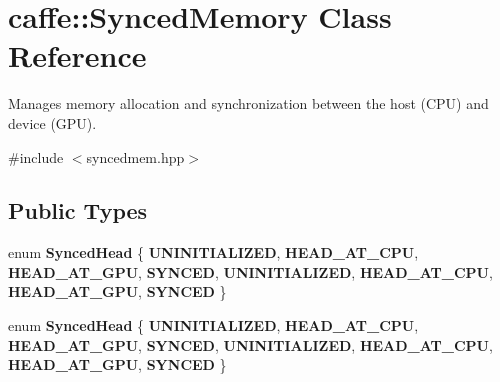 \hypertarget{classcaffe_1_1_synced_memory}{}\section{caffe\+:\+:Synced\+Memory Class Reference}
\label{classcaffe_1_1_synced_memory}


Manages memory allocation and synchronization between the host (C\+PU) and device (G\+PU).  




{\ttfamily \#include $<$syncedmem.\+hpp$>$}

\subsection*{Public Types}
\begin{DoxyCompactItemize}
\item 
\mbox{\label{classcaffe_1_1_synced_memory_aa9d505f04322f6e521a57b8fc51dfba1}} 
enum {\bfseries Synced\+Head} \{ \newline
{\bfseries U\+N\+I\+N\+I\+T\+I\+A\+L\+I\+Z\+ED}, 
{\bfseries H\+E\+A\+D\+\_\+\+A\+T\+\_\+\+C\+PU}, 
{\bfseries H\+E\+A\+D\+\_\+\+A\+T\+\_\+\+G\+PU}, 
{\bfseries S\+Y\+N\+C\+ED}, 
\newline
{\bfseries U\+N\+I\+N\+I\+T\+I\+A\+L\+I\+Z\+ED}, 
{\bfseries H\+E\+A\+D\+\_\+\+A\+T\+\_\+\+C\+PU}, 
{\bfseries H\+E\+A\+D\+\_\+\+A\+T\+\_\+\+G\+PU}, 
{\bfseries S\+Y\+N\+C\+ED}
 \}
\item 
\mbox{\label{classcaffe_1_1_synced_memory_aa9d505f04322f6e521a57b8fc51dfba1}} 
enum {\bfseries Synced\+Head} \{ \newline
{\bfseries U\+N\+I\+N\+I\+T\+I\+A\+L\+I\+Z\+ED}, 
{\bfseries H\+E\+A\+D\+\_\+\+A\+T\+\_\+\+C\+PU}, 
{\bfseries H\+E\+A\+D\+\_\+\+A\+T\+\_\+\+G\+PU}, 
{\bfseries S\+Y\+N\+C\+ED}, 
\newline
{\bfseries U\+N\+I\+N\+I\+T\+I\+A\+L\+I\+Z\+ED}, 
{\bfseries H\+E\+A\+D\+\_\+\+A\+T\+\_\+\+C\+PU}, 
{\bfseries H\+E\+A\+D\+\_\+\+A\+T\+\_\+\+G\+PU}, 
{\bfseries S\+Y\+N\+C\+ED}
 \}
\end{DoxyCompactItemize}
